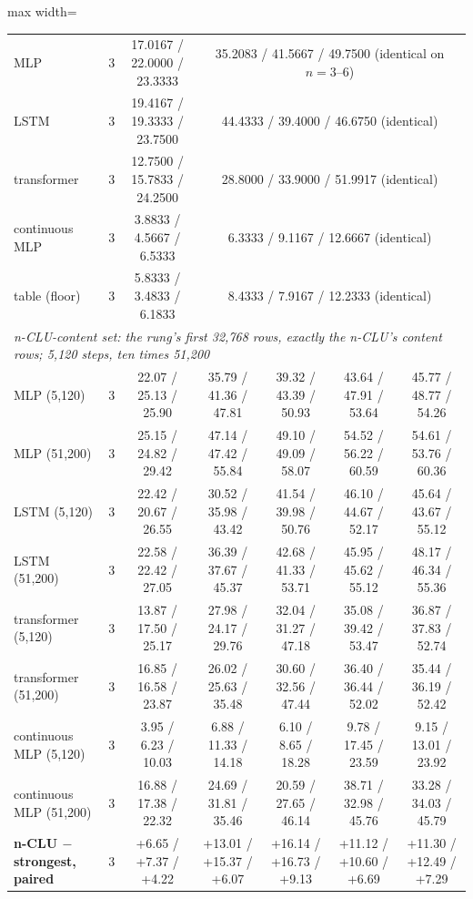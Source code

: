 \documentclass{article} %
\begin{document}
\begin{table}[t]
\begin{adjustbox}{max width=\linewidth}
\begin{tabular}{lcccccc}
MLP & 3 & 17.0167 / 22.0000 / 23.3333 & \multicolumn{4}{c}{35.2083 / 41.5667 / 49.7500 (identical on $n=3$--$6$)} \\
LSTM & 3 & 19.4167 / 19.3333 / 23.7500 & \multicolumn{4}{c}{44.4333 / 39.4000 / 46.6750 (identical)} \\
transformer & 3 & 12.7500 / 15.7833 / 24.2500 & \multicolumn{4}{c}{28.8000 / 33.9000 / 51.9917 (identical)} \\
continuous MLP & 3 & 3.8833 / 4.5667 / 6.5333 & \multicolumn{4}{c}{6.3333 / 9.1167 / 12.6667 (identical)} \\
table (floor) & 3 & 5.8333 / 3.4833 / 6.1833 & \multicolumn{4}{c}{8.4333 / 7.9167 / 12.2333 (identical)} \\
\midrule
\multicolumn{7}{l}{\emph{n-CLU-content set: the rung's first 32,768 rows, exactly the n-CLU's content rows; 5,120 steps, ten times 51,200}} \\ %
MLP (5,120) & 3 & 22.07 / 25.13 / 25.90 & 35.79 / 41.36 / 47.81 & 39.32 / 43.39 / 50.93 & 43.64 / 47.91 / 53.64 & 45.77 / 48.77 / 54.26 \\
MLP (51,200) & 3 & 25.15 / 24.82 / 29.42 & 47.14 / 47.42 / 55.84 & 49.10 / 49.09 / 58.07 & 54.52 / 56.22 / 60.59 & 54.61 / 53.76 / 60.36 \\
LSTM (5,120) & 3 & 22.42 / 20.67 / 26.55 & 30.52 / 35.98 / 43.42 & 41.54 / 39.98 / 50.76 & 46.10 / 44.67 / 52.17 & 45.64 / 43.67 / 55.12 \\
LSTM (51,200) & 3 & 22.58 / 22.42 / 27.05 & 36.39 / 37.67 / 45.37 & 42.68 / 41.33 / 53.71 & 45.95 / 45.62 / 55.12 & 48.17 / 46.34 / 55.36 \\
transformer (5,120) & 3 & 13.87 / 17.50 / 25.17 & 27.98 / 24.17 / 29.76 & 32.04 / 31.27 / 47.18 & 35.08 / 39.42 / 53.47 & 36.87 / 37.83 / 52.74 \\
transformer (51,200) & 3 & 16.85 / 16.58 / 23.87 & 26.02 / 25.63 / 35.48 & 30.60 / 32.56 / 47.44 & 36.40 / 36.44 / 52.02 & 35.44 / 36.19 / 52.42 \\
continuous MLP (5,120) & 3 & 3.95 / 6.23 / 10.03 & 6.88 / 11.33 / 14.18 & 6.10 / 8.65 / 18.28 & 9.78 / 17.45 / 23.59 & 9.15 / 13.01 / 23.92 \\
continuous MLP (51,200) & 3 & 16.88 / 17.38 / 22.32 & 24.69 / 31.81 / 35.46 & 20.59 / 27.65 / 46.14 & 38.71 / 32.98 / 45.76 & 33.28 / 34.03 / 45.79 \\
\textbf{n-CLU $-$ strongest, paired} & 3 & +6.65 / +7.37 / +4.22 & +13.01 / +15.37 / +6.07 & +16.14 / +16.73 / +9.13 & +11.12 / +10.60 / +6.69 & +11.30 / +12.49 / +7.29 \\

\end{tabular}
\end{adjustbox}
\end{table}
\end{document}
